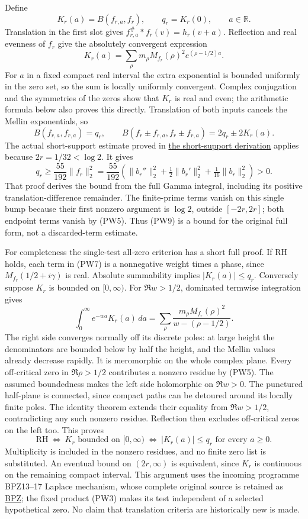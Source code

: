 \documentclass[
  10pt,
  a4paper,
]{article}
\begin{document}
Define \[
 K_r(a)=B(f_{r,a},f_r),\qquad q_r=K_r(0),\qquad a\in\mathbb R.
\tag{PW6}
\] Translation in the first slot gives \(f_{r,a}^\#*f_r(v)=h_r(v+a)\).
Reflection and real evenness of \(f_r\) give the absolutely convergent
expression \[
 K_r(a)=\sum_\rho m_\rho M_{f_r}(\rho)^2e^{(\rho-1/2)a}.
\tag{PW7}
\] For \(a\) in a fixed compact real interval the extra exponential is
bounded uniformly in the zero set, so the sum is locally uniformly
convergent. Complex conjugation and the symmetries of the zeros show
that \(K_r\) is real and even; the arithmetic formula below also proves
this directly. Translation of both inputs cancels the Mellin
exponentials, so \[
 B(f_{r,a},f_{r,a})=q_r,\qquad
 B(f_r\pm f_{r,a},f_r\pm f_{r,a})=2q_r\pm2K_r(a).
\tag{PW8}
\] The actual short-support estimate proved in
\href{PRIMITIVE_SHORT_SUPPORT_DERIVATION.md}{the short-support
derivation} applies because \(2r=1/32<\log2\). It gives \[
 q_r\ge\frac{55}{192}\|f_r\|_2^2
 =\frac{55}{192}\left(\|b_r''\|_2^2+\tfrac12\|b_r'\|_2^2
                         +\tfrac1{16}\|b_r\|_2^2\right)>0.
\tag{PW9}
\] That proof derives the bound from the full Gamma integral, including
its positive translation-difference remainder. The finite-prime terms
vanish on this single bump because their first nonzero argument is
\(\log2\), outside \([-2r,2r]\); both endpoint terms vanish by (PW5).
Thus (PW9) is a bound for the original full form, not a discarded-term
estimate.

For completeness the single-test all-zero criterion has a short full
proof. If RH holds, each term in (PW7) is a nonnegative weight times a
phase, since \(M_{f_r}(1/2+i\gamma)\) is real. Absolute summability
implies \(|K_r(a)|\le q_r\). Conversely suppose \(K_r\) is bounded on
\([0,\infty)\). For \(\Re w>1/2\), dominated termwise integration gives
\[
 \int_0^\infty e^{-wa}K_r(a)\,da
 =\sum_\rho\frac{m_\rho M_{f_r}(\rho)^2}{w-(\rho-1/2)}.
\tag{PW10}
\] The right side converges normally off its discrete poles: at large
height the denominators are bounded below by half the height, and the
Mellin values already decrease rapidly. It is meromorphic on the whole
complex plane. Every off-critical zero in \(\Re\rho>1/2\) contributes a
nonzero residue by (PW5). The assumed boundedness makes the left side
holomorphic on \(\Re w>0\). The punctured half-plane is connected, since
compact paths can be detoured around its locally finite poles. The
identity theorem extends their equality from \(\Re w>1/2\),
contradicting any such nonzero residue. Reflection then excludes
off-critical zeros on the left too. This proves \[
 \boxed{\mathrm{RH}\ \Longleftrightarrow\ K_r\text{ bounded on }[0,\infty)
 \ \Longleftrightarrow\ |K_r(a)|\le q_r\text{ for every }a\ge0.}
\tag{PW11}
\] Multiplicity is included in the nonzero residues, and no finite zero
list is substituted. An eventual bound on \((2r,\infty)\) is equivalent,
since \(K_r\) is continuous on the remaining compact interval. This
argument uses the incoming programme BPZ13--17 Laplace mechanism, whose
complete original source is retained as
\href{BOUNDARY_PRIMITIVE_ALL_ZERO_RECEIVER.tex}{BPZ}; the fixed product
(PW3) makes its test independent of a selected hypothetical zero. No
claim that translation criteria are historically new is made.
\end{document}
